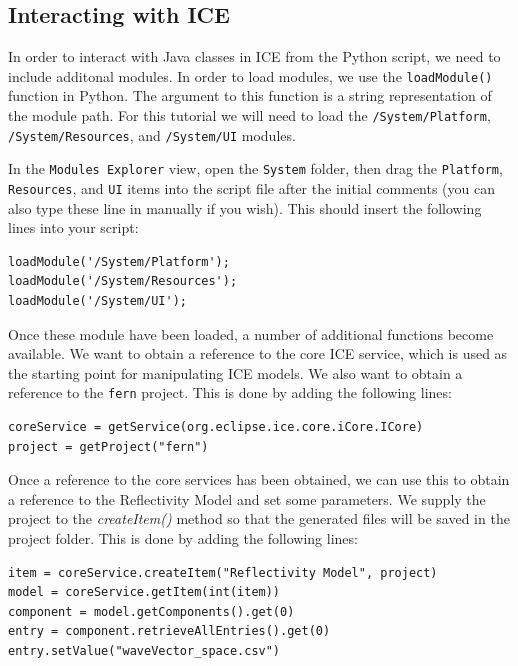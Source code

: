 \subsection{Interacting with ICE}

In order to interact with Java classes in ICE from the Python script, we 
need to include additonal modules. In order to load modules,
we use the \texttt{loadModule()} function in Python. The argument to this function is a
string representation of the module path. For this tutorial we will need to load
the \texttt{/System/Platform}, \texttt{/System/Resources}, and
\texttt{/System/UI} modules.

In the \texttt{Modules Explorer} view, open the \texttt{System} folder, then drag
the \texttt{Platform}, \texttt{Resources}, and \texttt{UI} items
into the script file after the initial comments (you can also type these line
in manually if you wish).
This should insert the following lines into your script:

\lstset{basicstyle=\ttfamily\small, breaklines}

{\small
\begin{verbatim}
loadModule('/System/Platform');
loadModule('/System/Resources');
loadModule('/System/UI');
\end{verbatim}
}

Once these module have been loaded, a number of additional functions become
available. We want to obtain a reference to the core ICE service, which is used
as the starting point for manipulating ICE models. We also want to obtain a
reference to the \texttt{fern} project. This is done by adding the following
lines:

{\small
\begin{verbatim}
coreService = getService(org.eclipse.ice.core.iCore.ICore)
project = getProject("fern")
\end{verbatim}
}

Once a reference to the core services has been obtained, we can use this to
obtain a reference to the Reflectivity Model and set some parameters. We supply
the project to the \textit{createItem()} method so that the generated files will
be saved in the project folder. This is done by adding the following lines:

{\small
\begin{verbatim}
item = coreService.createItem("Reflectivity Model", project)
model = coreService.getItem(int(item))
component = model.getComponents().get(0)
entry = component.retrieveAllEntries().get(0)
entry.setValue("waveVector_space.csv")
\end{verbatim}
}

